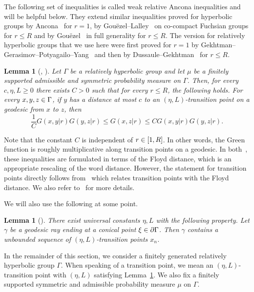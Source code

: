 \documentclass[10pt]{amsart}
\newtheorem{lemm}[theo]{Lemma}\newtheorem{prop}[theo]{Proposition}\newtheorem{coro}[theo]{Corollary}\newtheorem{conj}[theo]{Conjecture}
\theoremstyle{definition}\newtheorem{defi}[theo]{Definition}\newtheorem{rema}[theo]{Remark}\newtheorem{exam}[theo]{Example}\newtheorem{exem}[theo]{Example}\newtheorem{nota}[theo]{Notation}
\newcommand{\pG}{\partial{\Gamma}}
\let\oldin\in
\renewcommand{\in}{\mathchoice{\oldin}{\oldin}{\,\oldin\,}{\,\oldin\,}}
\begin{document}
The following set of inequalities is called weak relative Ancona inequalities and will be helpful below. They extend similar inequalities proved for hyperbolic groups by Ancona~\cite{Ancona} for $r=1$, by Gou\"ezel--Lalley~\cite{GouezelLalley} on co-compact Fuchsian groups for $r\leq R$ and by Gou\"ezel~\cite{Gouezel} in full generality for $r\leq R$. The version for relatively hyperbolic groups that we use here were first proved for $r=1$ by Gekhtman--Gerasimov--Potyagailo--Yang~\cite{GGPY} and then by Dussaule--Gekhtman~\cite{DG21} for $r\leq R$.

\begin{lemm}[{\cite[Theorem~1.1]{GGPY}, \cite[Theorem~1.6]{DG21}}]
\label{weakAncona}
Let $\Gamma$ be a relatively hyperbolic group and let $\mu$ be a finitely supported admissible and symmetric probability measure on $\Gamma$. Then, for every $c,\eta,L\geq 0$ there exists $C>0$ such that for every $r\leq R$, the following holds. For every $x,y,z\in \Gamma$, if $y$ has a distance at most $c$ to an $(\eta,L)$-transition point on a geodesic from $x$ to $z$, then
\[
\frac{1}{C}G(x,y|r)G(y,z|r)\leq G(x,z|r)\leq C G(x,y|r)G(y,z|r).
\]
\end{lemm}

Note that the constant $C$ is independent of $r\in [1,R]$. In other words, the Green function is roughly multiplicative along transition points on a geodesic. In both~\cite{DG21,GGPY}, these inequalities are formulated in terms of the Floyd distance, which is an appropriate rescaling of the word distance. However, the statement for transition points directly follows from~\cite[Corollary~5.10]{GePoGGD} which relates transition points with the Floyd distance. We also refer to~\cite[Section~9]{GGPY} for more details.

We will also use the following at some point.

\begin{lemm}[{\cite[Lemma~2.14]{YangPS}}]\label{ConCharLem}
There exist universal constants $\eta, L$ with the following property. Let $\gamma$ be a geodesic ray ending at a conical point $\xi\in\pG$. Then $\gamma$ contains a unbounded sequence of $(\eta,L)$-transition points $x_n$.
\end{lemm}


In the remainder of this section, we consider a finitely generated relatively hyperbolic group $\Gamma$. When speaking of a transition point, we mean an $(\eta,L)$-transition point with $(\eta,L)$ satisfying Lemma~\ref{ConCharLem}. We also fix a finitely supported symmetric and admissible probability measure $\mu$ on $\Gamma$.
\end{document}
